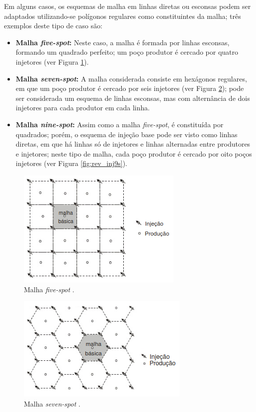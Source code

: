 Em alguns casos, os esquemas de malha em linhas diretas ou esconsas podem ser adaptados utilizando-se pol\'{i}gonos regulares como constituintes da malha; tr\^{e}s exemplos deste tipo de caso s\~{a}o:
\begin{itemize}
\item \textbf{Malha \textit{five-spot}:} Neste caso, a malha \'{e} formada por linhas esconsas, formando um quadrado perfeito; um po\c{c}o produtor \'{e} cercado por quatro injetores (ver Figura \ref{fig:rev_inj5s}).
\item \textbf{Malha \textit{seven-spot}:} A malha considerada consiste em hex\'{a}gonos regulares, em que um po\c{c}o produtor \'{e} cercado por seis injetores (ver Figura \ref{fig:rev_inj7s}); pode ser considerada um esquema de linhas esconsas, mas com altern\^{a}ncia de dois injetores para cada produtor em cada linha.
\item \textbf{Malha \textit{nine-spot}:} Assim como a malha \textit{five-spot}, \'{e} constitu\'{i}da por quadrados; por\'{e}m, o esquema de inje\c{c}\~{a}o base pode ser visto como linhas diretas, em que h\'{a} linhas s\'{o} de injetores e linhas alternadas entre produtores e injetores; neste tipo de malha, cada po\c{c}o produtor \'{e} cercado por oito po\c{c}os injetores (ver Figura \ref{fig:rev_inj9s}).
\end{itemize}

\begin{figure}[!ht]
\centering
\includegraphics[width=.6\textwidth]{figs/revisao/revisao_inj5s.png}
\caption{Malha \textit{five-spot} \cite[p. 568]{engres}.}
\label{fig:rev_inj5s}
\end{figure}

\begin{figure}[!ht]
\centering
\includegraphics[width=.6\textwidth]{figs/revisao/revisao_inj7s.png}
\caption{Malha \textit{seven-spot} \cite[p. 568]{engres}.}
\label{fig:rev_inj7s}
\end{figure}

